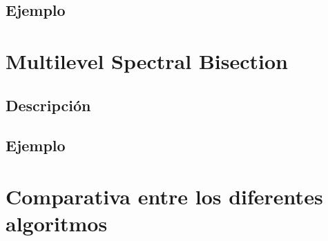\subsection{Ejemplo}

\section{Multilevel Spectral Bisection}

\subsection{Descripción}

\subsection{Ejemplo}

\section{Comparativa entre los diferentes algoritmos}

